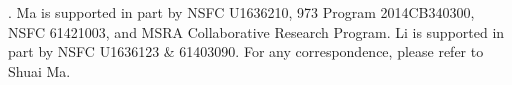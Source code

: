 .
Ma is supported in part by NSFC U1636210, 973 Program 2014CB340300, NSFC 61421003, and  MSRA Collaborative Research Program.
Li is supported in part by NSFC U1636123 \& 61403090.
 For any correspondence, please refer to Shuai Ma.

